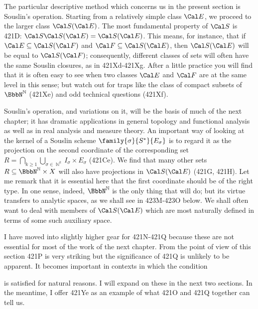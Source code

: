{The particular descriptive method which concerns us in the present
section is Souslin's operation.   Starting from a relatively simple
class $\Cal E$, we proceed to the larger class $\Cal S(\Cal E)$.   The
most fundamental property of $\Cal S$ is 421D:
$\Cal S\Cal S(\Cal E)=\Cal S(\Cal E)$.
This means, for instance, that if $\Cal E\subseteq\Cal S(\Cal F)$ and
$\Cal F\subseteq\Cal S(\Cal E)$, then $\Cal S(\Cal E)$ will be equal to
$\Cal S(\Cal F)$;  consequently, different classes of sets will often
have the same Souslin closures, as in 421Xd-421Xg.   After a little
practice you will find that it is often easy to see when two classes
$\Cal E$ and $\Cal F$ are at the same level in this sense;  but watch
out for traps like the
class of compact subsets of $\NN$ (421Xe) and odd technical
questions (421Xf).

Souslin's operation, and variations on it, will be the basis of much of
the next chapter;  it has dramatic applications in general topology and
functional analysis as well as in real analysis and measure theory.   An
important way of looking at the kernel of a Souslin scheme
$\family{\sigma}{S^*}{E_{\sigma}}$ is to regard it as the projection on
the second coordinate of the corresponding set
$R=\bigcap_{k\ge 1}\bigcup_{\sigma\in\BbbN^k}I_{\sigma}\times E_{\sigma}$
(421Ce).   We find that many other sets $R\subseteq\NN\times X$ will
also have projections in $\Cal S(\Cal E)$ (421G, 421H).   Let me remark
that it is essential here that the first coordinate should be of the
right type.   In one sense, indeed, $\NN$ is the only thing that
will do;  but its virtue transfers to analytic spaces, as we shall see in
423M-423O below.  %
We shall often
want to deal with members of $\Cal S(\Cal E)$ which are most naturally
defined in terms of some such auxiliary space.

I have moved into slightly higher gear for 421N-421Q
because these are not essential for most of the work of the next
chapter.   From the point of view of this section 421P is very striking
but the significance of 421Q is unlikely to be apparent.   It becomes
important in contexts in which the condition


\noindent is satisfied for natural reasons.   I will expand on these in
the next two sections.   In the meantime, I offer 421Ye as an example
of what 421O and 421Q together can tell us.
}%

\discrpage

